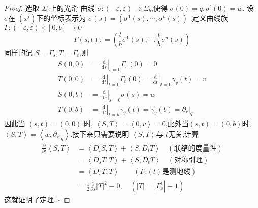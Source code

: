 \documentclass[../../几何与拓扑.tex]{subfiles}
\begin{document}
\begin{proof}
    选取 \(   \Sigma_b \)上的光滑 曲线 \(   \sigma :\left( - \varepsilon , \varepsilon  \right)\to  \Sigma   _{b} \),使得 \(   \sigma \left( 0 \right)=  q, \sigma ^{\prime} \left( 0 \right)= w    \).  设 \(   \sigma   \)在 \(  \left( x^{i} \right)   \)下的坐标表示为 \(   \sigma \left( s \right)= \left(  \sigma ^{1}\left( s \right),\cdots , \sigma ^{n}\left( s \right)   \right)    \)   .定义曲线族  \(   \Gamma : \left( - \varepsilon , \varepsilon  \right)\times \left[ 0,b \right]\to U    \) \[
     \Gamma \left( s,t \right) : =  \left( \frac{t }{b }  \sigma ^{1}\left( s \right),\cdots ,\frac{t }{b }  \sigma ^{n}\left( s \right)     \right) 
    \] 同样的记 \(  S =  \Gamma _{s},T =   \Gamma _{t}  \),则 \[
    \begin{aligned}
    S\left( 0,0 \right)& = \left. \frac{\,\mathrm{d}  }{\,\mathrm{d} s }  \right|_{s= 0} \Gamma _{s}\left( 0 \right)= 0\\ 
     T\left( 0,0 \right)& =  \left. \frac{\,\mathrm{d}  }{\,\mathrm{d} t }  \right|_{t= 0} \Gamma _{t}\left( 0 \right)= \left. \frac{\,\mathrm{d}  }{\,\mathrm{d} t }  \right|_{t= 0} \gamma _{v}\left( t \right)= v\\ 
      S\left( 0,b \right)&= \left. \frac{\,\mathrm{d}  }{\,\mathrm{d} s }  \right|_{s= 0} \sigma \left( s \right)= w\\ 
             T\left( 0,b \right)& =  \left. \frac{\,\mathrm{d}  }{\,\mathrm{d} t }  \right|_{t= b} \gamma _{v}\left( t \right)=  \gamma _{v}^{\prime} \left( b \right)= \left. \partial _{r} \right|_{q}     
    \end{aligned}
    \] 因此当 \(  \left( s,t \right)= \left( 0,0 \right)    \) 时, \(  \left<S,T \right>= \left<0,v \right>= 0  \),此外当\(  \left(s,t \right)= \left( 0,b \right)    \)时, \(  \left<S,T \right>= \left<w, \left. \partial _{r} \right|_{q} \right>  \).接下来只需要说明 \(  \left<S,T \right>  \)与 \(  t  \)无关,计算 \[
    \begin{aligned}
    \frac{\partial }{\partial t}\left<S,T \right>& = \left<D_{t}S,T \right>+ \left<S,D_{t}T \right>\quad (\text{联络的度量性}) \\ 
     & = \left<D_{s}T,T \right>+ \left<S,D_{t}T \right> \quad (\text{对称引理})\\ 
      & = \left<D_{s}T,T \right> \quad \quad ( \Gamma _{s}\left( t \right) \text{是测地线})\\ 
    & = \frac{1}{2} \frac{\partial }{\partial s}\left| T \right|^{2}\equiv 0 ,\quad (\left| T \right|= \left|  \Gamma ^{\prime} _{s} \right|\equiv 1  ) 
    \end{aligned}
    \]     这就证明了定理.
    \hfill $\square$
\end{proof}
\end{document}
